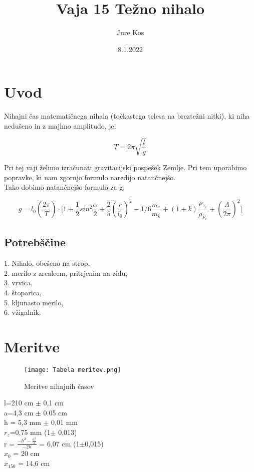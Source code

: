 \documentclass[a4paper]{report}
\begin{document}
\title{Vaja 15 Težno nihalo}
\author{Jure Kos }
\date{8.1.2022}
\graphicspath{{./images/} }
\maketitle


\chapter*{Uvod}
Nihajni čas matematičnega nihala (točkastega telesa na breztežni nitki), ki niha
nedušeno in z majhno amplitudo, je:

\[T=2\pi\sqrt{\frac{l}{g}}\]

Pri tej vaji želimo izračunati gravitacijski pospešek Zemlje. Pri tem uporabimo popravke, ki nam zgornjo formulo naredijo natančnejšo.\\
Tako dobimo natančnejšo formulo za g:

\[g = l_0(\frac{2\pi}{T})\cdot\Bigg[1+ \frac{1}{2}sin^2\frac{\alpha}{2}+\frac{2}{5}(\frac{r}{l_0})^2-1/6\frac{m_z}{m_k}+(1+k)\frac{\rho_{z_r}}{\rho_{F_e}}+(\frac{\Lambda}{2\pi})^2\Bigg]\]

\section*{Potrebščine}

1. Nihalo, obešeno na strop,\\
2. merilo z zrcalcem, pritrjenim na zidu,\\
3. vrvica,\\
4. štoparica,\\
5. kljunasto merilo,\\
6. vžigalnik.
\chapter*{Meritve}
\begin{figure}[H]
    \centering
    \texttt{[image: Tabela meritev.png]}
    \caption{Meritve nihajnih časov}
\end{figure}

l=210 cm $\pm$ 0,1 cm \\
a=4,3 cm $\pm$ 0.05 cm \\
h = 5,3 mm $\pm$ 0,01 mm\\
$r_z$=0,75 mm (1$\pm$ 0,013)\\
r = $\frac{-h^2-\frac{a^2}{3}}{-2h}$ = 6,07 cm (1$\pm$0,015)\\
$x_0$ = 20 cm \\
$x_{150}$ = 14,6 cm \\
\end{document}
